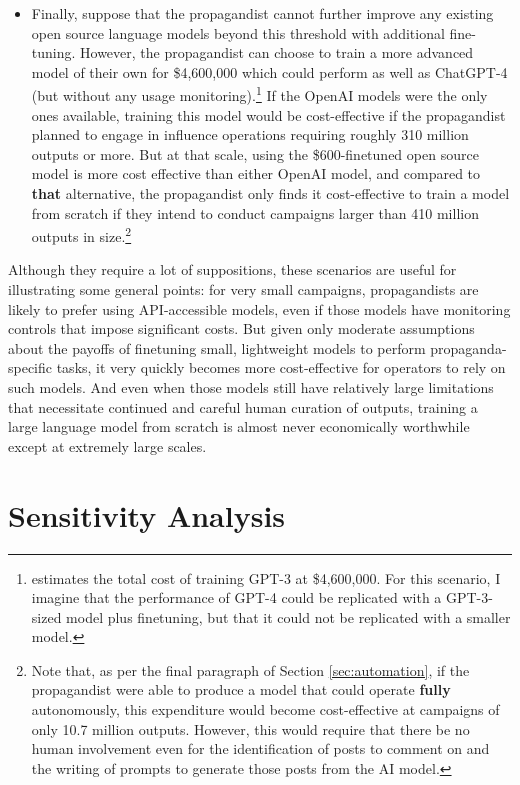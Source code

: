 \documentclass{article}
\begin{document}
\begin{itemize}
  \item Finally, suppose that the propagandist cannot further improve any existing open source language models beyond this threshold with additional fine-tuning. However, the propagandist can choose to train a more advanced model of their own for \$4,600,000 which could perform as well as ChatGPT-4 (but without any usage monitoring).\footnote{\cite{gpt3cost} estimates the total cost of training GPT-3 at \$4,600,000. For this scenario, I imagine that the performance of GPT-4 could be replicated with a GPT-3-sized model plus finetuning, but that it could not be replicated with a smaller model.} If the OpenAI models were the only ones available, training this model would be cost-effective if the propagandist planned to engage in influence operations requiring roughly 310 million outputs or more. But at that scale, using the \$600-finetuned open source model is more cost effective than either OpenAI model, and compared to \textbf{that} alternative, the propagandist only finds it cost-effective to train a model from scratch if they intend to conduct campaigns larger than 410 million outputs in size.\footnote{Note that, as per the final paragraph of Section \ref{sec:automation}, if the propagandist were able to produce a model that could operate \textbf{fully} autonomously, this expenditure would become cost-effective at campaigns of only 10.7 million outputs. However, this would require that there be no human involvement even for the identification of posts to comment on and the writing of prompts to generate those posts from the AI model.}
\end{itemize}

Although they require a lot of suppositions, these scenarios are useful for illustrating some general points: for very small campaigns, propagandists are likely to prefer using API-accessible models, even if those models have monitoring controls that impose significant costs. But given only moderate assumptions about the payoffs of finetuning small, lightweight models to perform propaganda-specific tasks, it very quickly becomes more cost-effective for operators to rely on such models. And even when those models still have relatively large limitations that necessitate continued and careful human curation of outputs, training a large language model from scratch is almost never economically worthwhile except at extremely large scales. 

\section{Sensitivity Analysis}
\label{sec:robustness}
\end{document}
